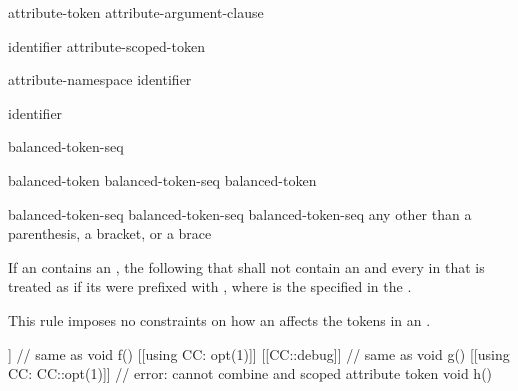 \begin{bnf}
\br
    attribute-token attribute-argument-clause\opt
\end{bnf}

\begin{bnf}
\br
    identifier\br
    attribute-scoped-token
\end{bnf}

\begin{bnf}
\br
    attribute-namespace \terminal{::} identifier
\end{bnf}

\begin{bnf}
\br
    identifier
\end{bnf}

\begin{bnf}
\br
    \terminal{(} balanced-token-seq\opt{} \terminal{)}
\end{bnf}

\begin{bnf}
\br
    balanced-token\br
    balanced-token-seq balanced-token
\end{bnf}

\begin{bnf}
\br
    \terminal{(} balanced-token-seq\opt{} \terminal{)}\br
    \terminal{[} balanced-token-seq\opt{} \terminal{]}\br
    \terminal{\{} balanced-token-seq\opt{} \terminal{\}}\br
    \textnormal{any  other than a parenthesis, a bracket, or a brace}
\end{bnf}

\pnum
If an 
contains an ,
the  following that 
shall not contain an 
and every  in that 
is treated as if
its  were prefixed with ,
where  is the 
specified in the .
\begin{note}
This rule imposes no constraints on how
an 
affects the tokens in an .
\end{note}
\begin{example}
\begin{codeblock}
[[using CC: opt(1), debug]]        // same as 
  void f() {}
[[using CC: opt(1)]] [[CC::debug]] // same as \tcode{[[CC::opt(1)]] [[CC::debug]]}
  void g() {}
[[using CC: CC::opt(1)]]           // error: cannot combine  and scoped attribute token
  void h() {}
\end{codeblock}
\end{example}

